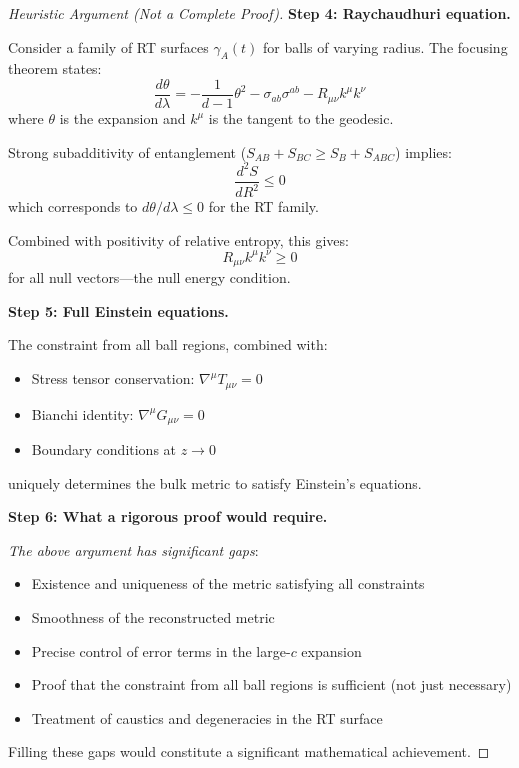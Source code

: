 \documentclass[12pt,a4paper]{article}
\begin{document}
\begin{proof}[Heuristic Argument (Not a Complete Proof)]
\textbf{Step 4: Raychaudhuri equation.}

Consider a family of RT surfaces $\gamma_A(t)$ for balls of varying radius. The focusing theorem states:
\begin{equation}
\frac{d\theta}{d\lambda} = -\frac{1}{d-1}\theta^2 - \sigma_{ab}\sigma^{ab} - R_{\mu\nu}k^\mu k^\nu
\end{equation}
where $\theta$ is the expansion and $k^\mu$ is the tangent to the geodesic.

Strong subadditivity of entanglement ($S_{AB} + S_{BC} \geq S_B + S_{ABC}$) implies:
\begin{equation}
\frac{d^2 S}{dR^2} \leq 0
\end{equation}
which corresponds to $d\theta/d\lambda \leq 0$ for the RT family.

Combined with positivity of relative entropy, this gives:
\begin{equation}
R_{\mu\nu} k^\mu k^\nu \geq 0
\end{equation}
for all null vectors---the null energy condition.

\textbf{Step 5: Full Einstein equations.}

The constraint from all ball regions, combined with:
\begin{itemize}
    \item Stress tensor conservation: $\nabla^\mu T_{\mu\nu} = 0$
    \item Bianchi identity: $\nabla^\mu G_{\mu\nu} = 0$
    \item Boundary conditions at $z \to 0$
\end{itemize}
uniquely determines the bulk metric to satisfy Einstein's equations.

\textbf{Step 6: What a rigorous proof would require.}

\textit{The above argument has significant gaps}:
\begin{itemize}
    \item Existence and uniqueness of the metric satisfying all constraints
    \item Smoothness of the reconstructed metric
    \item Precise control of error terms in the large-$c$ expansion
    \item Proof that the constraint from all ball regions is sufficient (not just necessary)
    \item Treatment of caustics and degeneracies in the RT surface
\end{itemize}
Filling these gaps would constitute a significant mathematical achievement.
\end{proof}
\end{document}
